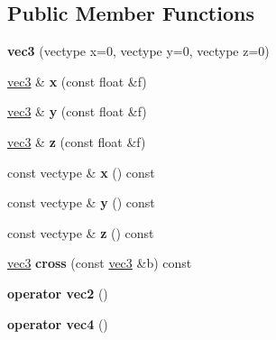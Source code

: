 \subsection*{Public Member Functions}
\begin{DoxyCompactItemize}
\item 
\hypertarget{structj3d_1_1vec3_a586336cd07358b1646e3b8d48d1f952b}{}{\bfseries vec3} (vectype x=0, vectype y=0, vectype z=0)\label{structj3d_1_1vec3_a586336cd07358b1646e3b8d48d1f952b}

\item 
\hypertarget{structj3d_1_1vec3_a71a95c2d4c871c75316db7a0674d6fb1}{}\hyperlink{structj3d_1_1vec3}{vec3} \& {\bfseries x} (const float \&f)\label{structj3d_1_1vec3_a71a95c2d4c871c75316db7a0674d6fb1}

\item 
\hypertarget{structj3d_1_1vec3_aef56e1ab067904c3064e95ecbbe76c42}{}\hyperlink{structj3d_1_1vec3}{vec3} \& {\bfseries y} (const float \&f)\label{structj3d_1_1vec3_aef56e1ab067904c3064e95ecbbe76c42}

\item 
\hypertarget{structj3d_1_1vec3_ae5b7f71e5d87849b7050a3b03a4c0001}{}\hyperlink{structj3d_1_1vec3}{vec3} \& {\bfseries z} (const float \&f)\label{structj3d_1_1vec3_ae5b7f71e5d87849b7050a3b03a4c0001}

\item 
\hypertarget{structj3d_1_1vec3_a5113ce9fbd2fea3950402a2d9f679ba6}{}const vectype \& {\bfseries x} () const \label{structj3d_1_1vec3_a5113ce9fbd2fea3950402a2d9f679ba6}

\item 
\hypertarget{structj3d_1_1vec3_a5b34a5b9076331f0e1caba82950c516c}{}const vectype \& {\bfseries y} () const \label{structj3d_1_1vec3_a5b34a5b9076331f0e1caba82950c516c}

\item 
\hypertarget{structj3d_1_1vec3_a16338d36f5a8a98fb60ae9653e017cc7}{}const vectype \& {\bfseries z} () const \label{structj3d_1_1vec3_a16338d36f5a8a98fb60ae9653e017cc7}

\item 
\hypertarget{structj3d_1_1vec3_ad7a25d9a9850991ae3cf3458e39167a7}{}\hyperlink{structj3d_1_1vec3}{vec3} {\bfseries cross} (const \hyperlink{structj3d_1_1vec3}{vec3} \&b) const \label{structj3d_1_1vec3_ad7a25d9a9850991ae3cf3458e39167a7}

\item 
\hypertarget{structj3d_1_1vec3_a8038b5db4017948553b7098b1e617114}{}{\bfseries operator vec2} ()\label{structj3d_1_1vec3_a8038b5db4017948553b7098b1e617114}

\item 
\hypertarget{structj3d_1_1vec3_a0877f0584e2ae18ece4b04f279afc2b8}{}{\bfseries operator vec4} ()\label{structj3d_1_1vec3_a0877f0584e2ae18ece4b04f279afc2b8}

\end{DoxyCompactItemize}

